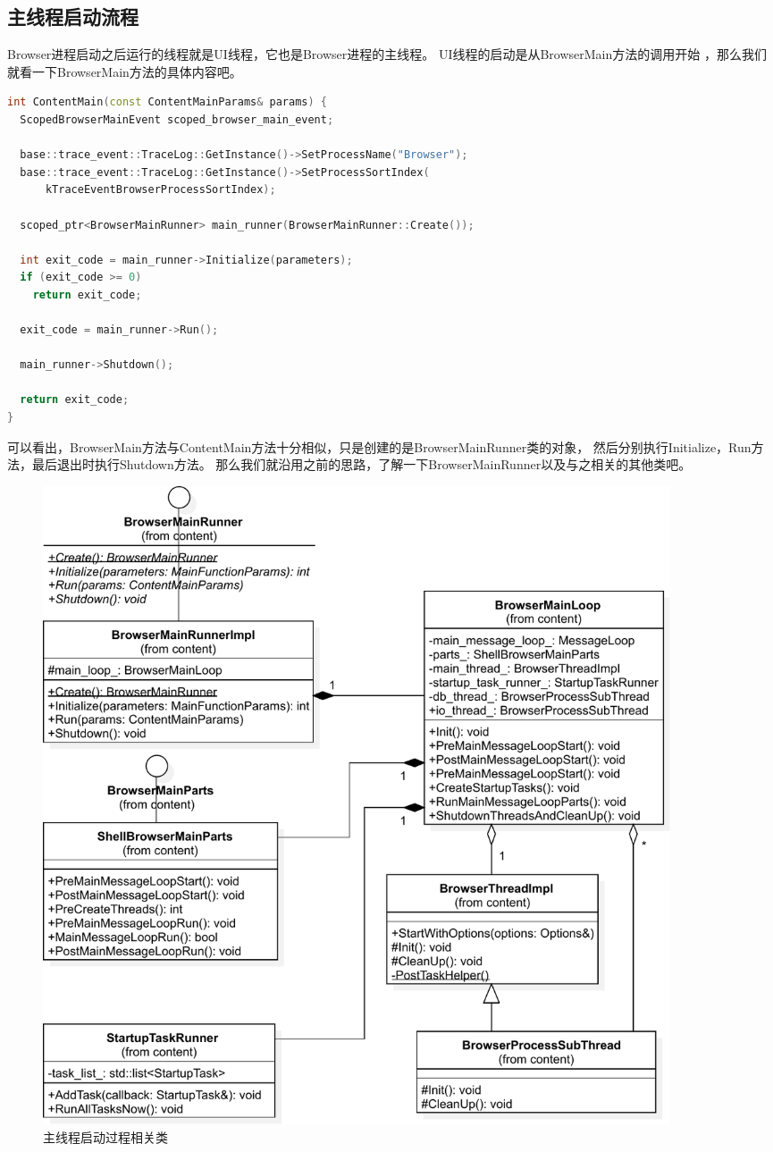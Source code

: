 \subsection{主线程启动流程}
Browser进程启动之后运行的线程就是UI线程，它也是Browser进程的主线程。
UI线程的启动是从BrowserMain方法的调用开始 ，那么我们就看一下BrowserMain方法的具体内容吧。

\begin{spacing}{1.0}
\begin{lstlisting}[language={C++}]
int ContentMain(const ContentMainParams& params) {
  ScopedBrowserMainEvent scoped_browser_main_event;

  base::trace_event::TraceLog::GetInstance()->SetProcessName("Browser");
  base::trace_event::TraceLog::GetInstance()->SetProcessSortIndex(
      kTraceEventBrowserProcessSortIndex);

  scoped_ptr<BrowserMainRunner> main_runner(BrowserMainRunner::Create());

  int exit_code = main_runner->Initialize(parameters);
  if (exit_code >= 0)
    return exit_code;

  exit_code = main_runner->Run();

  main_runner->Shutdown();
  
  return exit_code;
}
\end{lstlisting}
\end{spacing}

可以看出，BrowserMain方法与ContentMain方法十分相似，只是创建的是BrowserMainRunner类的对象，
然后分别执行Initialize，Run方法，最后退出时执行Shutdown方法。
那么我们就沿用之前的思路，了解一下BrowserMainRunner以及与之相关的其他类吧。

\begin{figure}[H] 
  \centering 
  \includegraphics[width=0.90\textwidth]{image/process_study/MainThreadStartClass.pdf} 
  \caption{主线程启动过程相关类} \label{fig:MainThreadStartClass} 
\end{figure}

